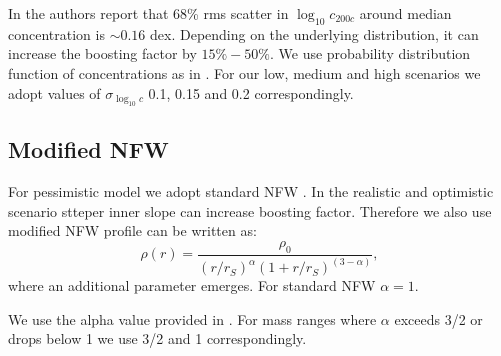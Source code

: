 In \citet{Diemer_2015} the authors report that 68\% rms scatter in $\log_{10}c_{200c}$ around median concentration is $\sim 0.16$ dex. Depending on the underlying distribution, it can increase the boosting factor by $15\%-50\%$. We use probability distribution function of concentrations as in \cite{2014arXiv1412.4308M}. For our low, medium and high scenarios we adopt values of $\sigma_{\log_{10} c}$ 0.1, 0.15 and 0.2 correspondingly.

\subsection{Modified NFW}
For pessimistic model we adopt standard NFW \cite{1997ApJ...490..493N}. In the realistic and optimistic scenario stteper inner slope can increase boosting factor. Therefore we also use modified NFW profile can be written as:
\begin{equation}
\rho(r) = \dfrac{\rho_0}{(r/r_S)^\alpha(1+r/r_S)^{(3-\alpha)}},
\end{equation}
where an additional parameter \alpha emerges. For standard NFW $\alpha=1$.


We use the alpha value provided in \cite{Ishiyama_2014}. For mass ranges where $\alpha$ exceeds 3/2 or drops below 1 we use 3/2 and 1 correspondingly.